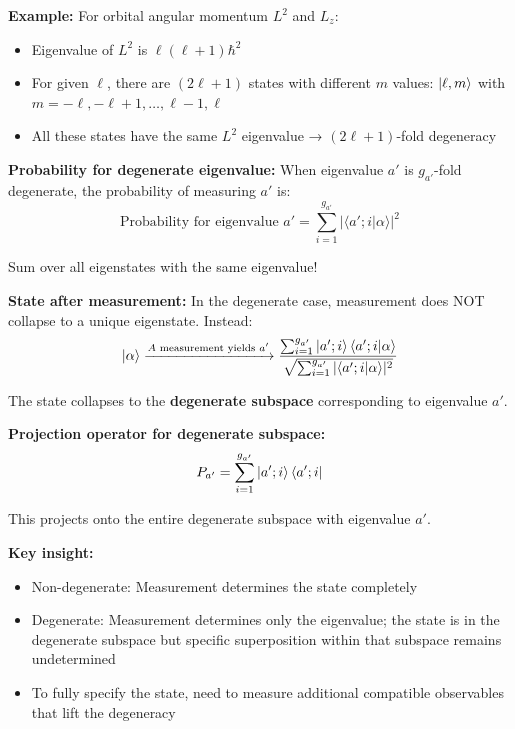 \documentclass[11pt,a4paper]{article}
\begin{document}
\textbf{Example:} For orbital angular momentum $L^2$ and $L_z$:
\begin{itemize}
\item Eigenvalue of $L^2$ is $\ell(\ell+1)\hbar^2$
\item For given $\ell$, there are $(2\ell + 1)$ states with different $m$ values: $\ket{\ell, m}$ with $m = -\ell, -\ell+1, \ldots, \ell-1, \ell$
\item All these states have the same $L^2$ eigenvalue → $(2\ell+1)$-fold degeneracy
\end{itemize}

\textbf{Probability for degenerate eigenvalue:}
When eigenvalue $a'$ is $g_{a'}$-fold degenerate, the probability of measuring $a'$ is:
\begin{equation}
\boxed{\text{Probability for eigenvalue } a' = \sum_{i=1}^{g_{a'}}|\langle a'; i|\alpha\rangle|^2}
\tag{degenerate}
\end{equation}

Sum over all eigenstates with the same eigenvalue!

\textbf{State after measurement:}
In the degenerate case, measurement does NOT collapse to a unique eigenstate. Instead:
\begin{equation}
\ket{\alpha} \xrightarrow{A \text{ measurement yields } a'} \frac{\sum_{i=1}^{g_{a'}}\ket{a'; i}\langle a'; i|\alpha\rangle}{\sqrt{\sum_{i=1}^{g_{a'}}|\langle a'; i|\alpha\rangle|^2}}
\end{equation}

The state collapses to the \textbf{degenerate subspace} corresponding to eigenvalue $a'$.

\textbf{Projection operator for degenerate subspace:}
\begin{equation}
P_{a'} = \sum_{i=1}^{g_{a'}}\ket{a'; i}\langle a'; i|
\end{equation}

This projects onto the entire degenerate subspace with eigenvalue $a'$.

\textbf{Key insight:} 
\begin{itemize}
\item Non-degenerate: Measurement determines the state completely
\item Degenerate: Measurement determines only the eigenvalue; the state is in the degenerate subspace but specific superposition within that subspace remains undetermined
\item To fully specify the state, need to measure additional compatible observables that lift the degeneracy
\end{itemize}
\end{document}
